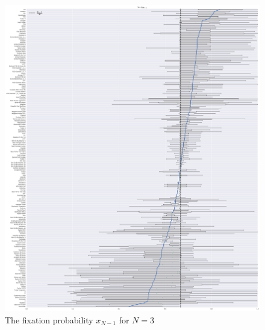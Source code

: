 \documentclass{article}
\begin{document}
\begin{figure}[!hbtp]
    \centering
    \includegraphics[height=.9\textheight]{./img/boxplot_3_resist.pdf}
    \caption{The fixation probability \(x_{N-1}\) for \(N=3\)}
    \label{fig:boxplot_3_resist}
\end{figure}
\end{document}
